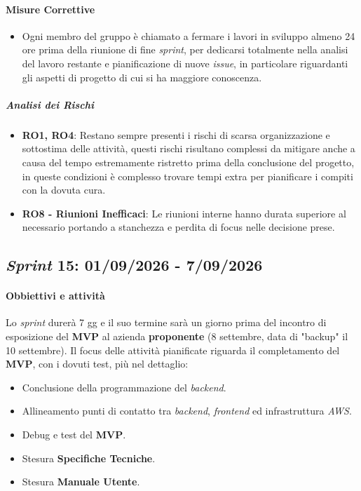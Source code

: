 \documentclass[12pt, a4paper]{article}
\begin{document}
{\paragraph{Misure Correttive}
\begin{itemize}
    \item Ogni membro del gruppo è chiamato a fermare i lavori in sviluppo almeno 24 ore prima della riunione di fine \textit{sprint}, per dedicarsi totalmente nella analisi del lavoro restante e pianificazione di nuove \textit{issue}, in particolare riguardanti gli aspetti di progetto di cui si ha maggiore conoscenza.
\end{itemize}

\subparagraph{Analisi dei Rischi}
\begin{itemize}
    \item \textbf{RO1, RO4}: Restano sempre presenti i rischi di scarsa organizzazione e sottostima delle attività, questi rischi risultano complessi da mitigare anche a causa del tempo estremamente ristretto prima della conclusione del progetto, in queste condizioni è complesso trovare tempi extra per pianificare i compiti con la dovuta cura.
    \item \textbf{RO8 - Riunioni Inefficaci}: Le riunioni interne hanno durata superiore al necessario portando a stanchezza e perdita di focus nelle decisione prese.
\end{itemize}



\subsection{\textit{Sprint} 15: 01/09/2026 - 7/09/2026}
\paragraph{Obbiettivi e attività} Lo \textit{sprint} durerà 7 gg e il suo termine sarà un giorno prima del incontro di esposizione del \textbf{MVP} al azienda \textbf{proponente} (8 settembre, data di "backup" il 10 settembre).
Il focus delle attività pianificate riguarda il completamento del \textbf{MVP}, con i dovuti test, più nel dettaglio:
\begin{itemize}
    \item Conclusione della programmazione del \textit{backend}.
    \item Allineamento punti di contatto tra \textit{backend}, \textit{frontend} ed infrastruttura \textit{AWS}.
    \item Debug e test del \textbf{MVP}.
    \item Stesura \textbf{Specifiche Tecniche}.
    \item Stesura \textbf{Manuale Utente}.
\end{itemize}

}
\end{document}
